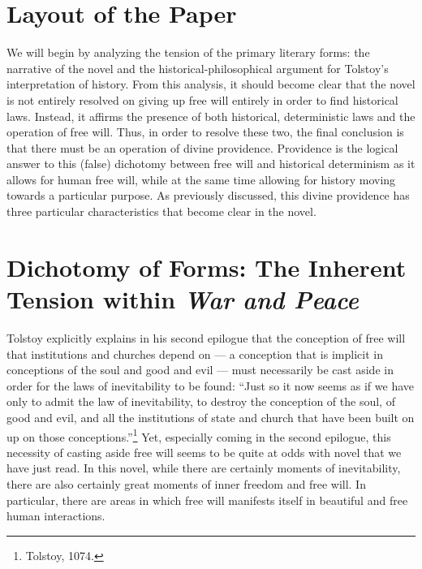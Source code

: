 \documentclass[12pt]{article}
\begin{document}
\section{Layout of the Paper}
We will begin by analyzing the tension of the primary literary forms: the narrative of the novel and the historical-philosophical argument for Tolstoy's interpretation of history. From this analysis, it should become clear that the novel is not entirely resolved on giving up free will entirely in order to find historical laws. Instead, it affirms the presence of both historical, deterministic laws and the operation of free will. Thus, in order to resolve these two, the final conclusion is that there must be an operation of divine providence. Providence is the logical answer to this (false) dichotomy between free will and historical determinism as it allows for human free will, while at the same time allowing for history moving towards a particular purpose. As previously discussed, this divine providence has three particular characteristics that become clear in the novel.

\section{Dichotomy of Forms: The Inherent Tension within \emph{War and Peace}} 
Tolstoy explicitly explains in his second epilogue that the conception of free will that institutions and churches depend on — a conception that is implicit in conceptions of the soul and good and evil — must necessarily be cast aside in order for the laws of inevitability to be found: ``Just so it now seems as if we have only to admit the law of inevitability, to destroy the conception of the soul, of good and evil, and all the institutions of state and church that have been built on up on those conceptions.''\footnote{Tolstoy, 1074.} Yet, especially coming in the second epilogue, this necessity of casting aside free will seems to be quite at odds with novel that we have just read. In this novel, while there are certainly moments of inevitability, there are also certainly great moments of inner freedom and free will. In particular, there are areas in which free will manifests itself in beautiful and free human interactions.
 
\end{document}
